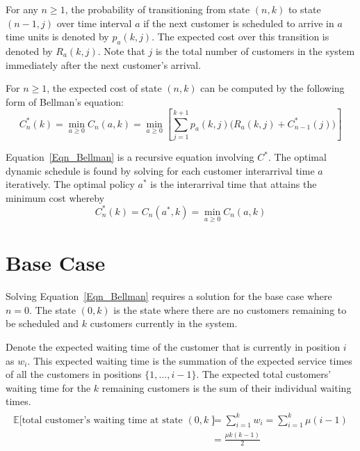 For any $n \geq 1$, the probability of transitioning from state $(n, k)$ to state $(n - 1, j)$ over time interval $a$ if the next customer is scheduled to arrive in $a$ time units is denoted by $p_{a} (k, j)$. The expected cost over this transition is denoted by $R_{a} (k, j)$. Note that $j$ is the total number of customers in the system immediately after the next customer's arrival.

For $n \geq 1$, the expected cost of state $(n, k)$ can be computed by the following form of Bellman's equation:
\begin{equation}
	C_{n}^{*} (k) = \min_{a \geq 0} C_{n} (a, k) = \min_{a \geq 0} \left[ \sum_{j = 1}^{k + 1} p_{a} (k, j) \Big( R_{a} (k, j) + C_{n - 1}^{*} (j) \Big) \right]
	\label{Eqn_Bellman}
\end{equation}

Equation~\ref{Eqn_Bellman} is a recursive equation involving $C^{*}$. The optimal dynamic schedule is found by solving for each customer interarrival time $a$ iteratively. The optimal policy $a^{*}$ is the interarrival time that attains the minimum cost whereby
\begin{equation}
	C_{n}^{*} (k) = C_{n} (a^{*}, k) = \min_{a \geq 0} C_{n} (a, k)
\end{equation}

\section{Base Case}
Solving Equation~\ref{Eqn_Bellman} requires a solution for the base case where $n = 0$. The state $(0, k)$ is the state where there are no customers remaining to be scheduled and $k$ customers currently in the system.

Denote the expected waiting time of the customer that is currently in position $i$ as $w_{i}$. This expected waiting time is the summation of the expected service times of all the customers in positions $\{ 1, \ldots, i - 1 \}$. The expected total customers' waiting time for the $k$ remaining customers is the sum of their individual waiting times.
\begin{align}
	\begin{split}
		\mathbb{E} \Big[\text{total customer's waiting time at state $(0, k)$} \Big] & = \sum_{i = 1}^{k} w_{i} = \sum_{i = 1}^{k} \mu (i - 1) \\
		& = \frac{\mu k (k - 1)}{2}
	\end{split}
\end{align}

